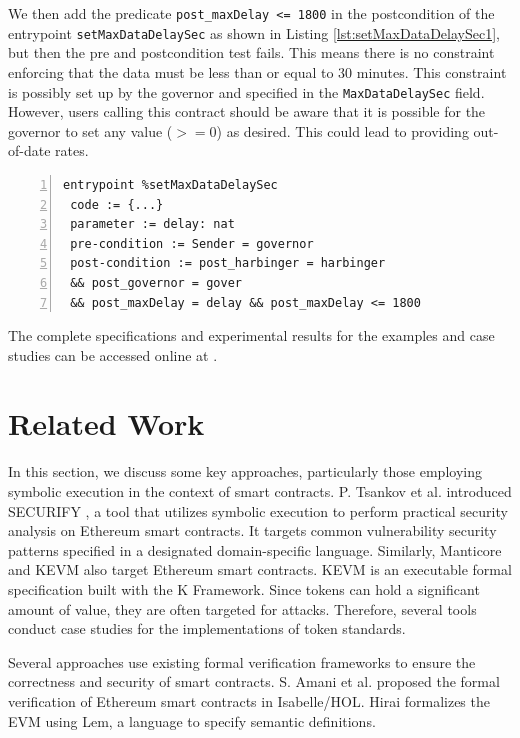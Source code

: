 \documentclass[runningheads]{llncs}
\begin{document}
We then add the predicate \lstinline/post_maxDelay <= 1800/ in the postcondition of the entrypoint \lstinline/setMaxDataDelaySec/ as shown in Listing \ref{lst:setMaxDataDelaySec1}, but then the pre and postcondition test fails. This means there is no constraint enforcing that the data must be less than or equal to 30 minutes. This constraint is possibly set up by the governor and specified in the \lstinline/MaxDataDelaySec/ field. However, users calling this contract should be aware that it is possible for the governor to set any value ($>=0$) as desired. This could lead to providing out-of-date rates.
\begin{lstlisting}[float=tp,captionpos=b,caption={The specification of the \lstinline/setMaxDataDelaySec/ entrypoint},label={lst:setMaxDataDelaySec1},numbers=left]
entrypoint %setMaxDataDelaySec
 code := {...}
 parameter := delay: nat
 pre-condition := Sender = governor            
 post-condition := post_harbinger = harbinger 
 && post_governor = gover
 && post_maxDelay = delay && post_maxDelay <= 1800
\end{lstlisting}

The complete specifications and experimental results for the examples and case studies can be accessed online at \cite{scv}.
\section{Related Work}
\label{sec:related-work}
In this section, we discuss some key approaches, particularly those employing symbolic execution in the context of smart contracts. P. Tsankov et al. introduced
SECURIFY \cite{securify}, a tool that utilizes symbolic execution to
perform practical security analysis on Ethereum smart contracts. It
targets common vulnerability security patterns specified in a
designated domain-specific language. 
Similarly, Manticore
\cite{manticore} and KEVM \cite{kevm} also target Ethereum smart contracts. KEVM is an executable formal
specification built with the K Framework.
Since tokens can hold a significant amount of value, they are often targeted for
attacks. Therefore, several tools \cite{kevm,park} conduct case
studies for the implementations of token standards. 

Several approaches use existing formal verification frameworks to
ensure the correctness and security of smart contracts. S. Amani et
al. \cite{isabelle} proposed the formal verification of Ethereum smart
contracts in Isabelle/HOL. Hirai \cite{hirai} formalizes the EVM using
Lem, a language to specify semantic definitions. 
\end{document}
